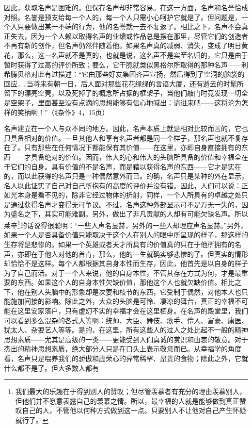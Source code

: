 \documentclass[12pt,oneside]{book}
\begin{document}
因此，获取名声是困难的。但保存名声却非常容易。在这一方面，名声和名誉恰成对照。名誉是预支给每一个人的，每一个人只需小心呵护它就是了。但问题是，一个人只要做出某一不端的行为，他的名誉就一去不复返了。相比之下，名声不会真正失去，因为一个人赖以取得名声的业绩或作品总是摆在那里，尽管它们的创造者不再有新的创作，但名声仍然伴随着他。如果名声真的减弱、消失，变成了明日黄花，那么，这一名声就不是真的，也就是说，这名声不是实至名归的，它只是由于暂时获得了过高的评价所致；要么，它干脆就类似黑格尔所取得的那种名声——利希腾贝格对此有过描述：“它由那些好友集团齐声宣扬，然后得到了空洞的脑袋的回应……当将来有朝一日，后人面对那些花花绿绿的言语大厦，还有逝去的时髦所留下的漂亮空壳，以及死掉了的概念所占据的框架子，当他们敲门时竟发现一切全是空架子，里面甚至没有点滴的思想能够有信心地喊出：请进来吧——这将沦为怎样的笑柄啊！”（《杂作》4，15页） 

名声建立在一个人与众不同的地方。因此，名声本质上就是相对比较而言的，它也只具备相对的价值。一旦其他人和享有名声者都是同一个样子，那名声也就不复存在了。只有那些在任何情况下都能保有其价值——在这里，亦即自身直接拥有的东西——才具备绝对的价值。因而，伟大的心和伟大的头脑所具备的价值和幸福全在于它们的自身。具有价值的不是名声，而是藉以获得名声的东西——它才是实在的，而以此获得的名声只是一种偶然意外而已。的确，名声只是某种的外在显示，名人以此证实了自己对自己所抱有的高度的评价并没有错。因此，人们可以说：正如光本身是看不见的，除非它经过物体的折射，同样，一个人所具有的卓越之处只是通过获得名声才变得无可争议。不过，名声这种外部显示可不是万无一失的，因为盛名之下，其实可能难副。另外，做出了非凡贡献的人却有可能欠缺名声。所以莱辛\footnote{我们最大的乐趣在于得到别人的赞叹；但尽管羡慕者有充分的理由羡慕别人，但他们并不愿意表露自己的羡慕之情。所以，最幸福的人就是能够做到真正赞叹自己的人，不管他以何种方式做到这一点。只要别人不让他对自己产生怀疑就行了。}的话说得很聪明：“一些人声名显赫，另外的一些人却理应声名显赫。”另外，如果一个人是否具备价值只能取决于这个人在别人的眼中所呈现的样子，那这样的生存将是悲惨的。如果一个英雄或者天才所具有的价值真的只在于他所拥有的名声，亦即在于他人对他的首肯，那么，他的一生就确实够悲惨的了。但真实的情形却恰恰不是这样。每个人都根据其自身本性而生存，因此，他首先是以自身的样子为了自己而活。对于一个人来说，他的自身本性，不管其存在方式为何，才是最重要的东西。如果这个人的自身本性欠缺价值，那他这个人也就欠缺价值。相比之下，他在别人头脑中的形象却是次要和枝节的东西，它受制于偶然，对他本人也只能施加间接的影响。除此之外，大众的头脑是可怜、凄凉的舞台，真正的幸福不可能在这里安家落户，只有虚幻不实的幸福才会在这里栖身。在名声的殿堂里，我们可以看到多么混杂的各式人等啊：统帅、大臣、舞伎、歌手、伶人、富豪、庸医、犹太人、杂耍艺人等等。是的，在这里，所有这些人的过人之处比起不一般的精神思想素质——尤其是高级的一类——更能受到人们真诚的赏识和由衷的敬意。对于杰出的精神思想素质，绝大部分人只是在口头上表示敬意而已。从幸福学的角度看，名声只是喂养我们的骄傲和虚荣心的异常稀罕、昂贵的食物；除此之外，它就什么都不是了。但大多数人都有
\end{document}
